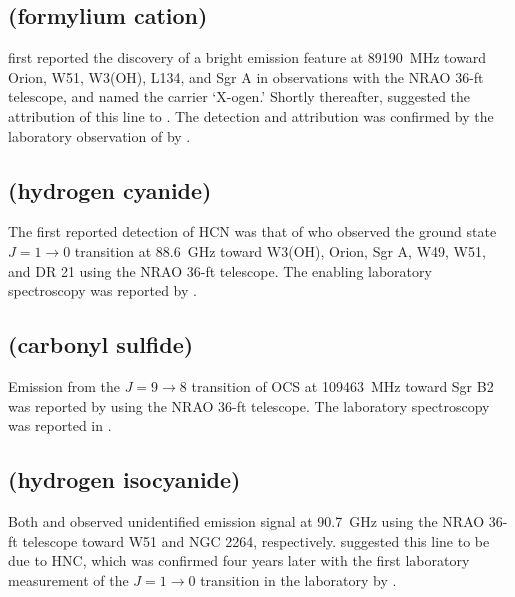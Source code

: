 \documentclass[twocolumn]{aastex631}
\begin{document}
    \subsection{ (formylium cation)}
    \label{HCO+}
    
    \citet{Buhl:1970rd} first reported the discovery of a bright emission feature at 89190~MHz toward Orion, W51, W3(OH), L134, and Sgr A in observations with the NRAO 36-ft telescope, and named the carrier `X-ogen.'  Shortly thereafter, \citet{Klemperer:1970uh} suggested the attribution of this line to .  The detection and attribution was confirmed by the laboratory observation of  by \citet{Woods:1975vi}.
    
    \subsection{ (hydrogen cyanide)}
    \label{HCN}
    
    The first reported detection of HCN was that of \citet{Snyder:1971ps} who observed the ground state $J = 1\rightarrow0$ transition at 88.6~GHz toward W3(OH), Orion, Sgr A, W49, W51, and DR 21 using the NRAO 36-ft telescope.  The enabling laboratory spectroscopy was reported by \citet{deLucia:1969hg}.
    
    \subsection{ (carbonyl sulfide)}
    \label{OCS}
    
    Emission from the $J = 9\rightarrow8$ transition of OCS at 109463~MHz toward Sgr B2 was reported by \citet{Jefferts:1971hy} using the NRAO 36-ft telescope.  The laboratory spectroscopy was reported in \citet{King:1954bn}.
    
    \subsection{ (hydrogen isocyanide)}
    \label{HNC}
    
    Both \citet{Zuckerman:1972cm} and \citet{Snyder:1972jh} observed unidentified emission signal at 90.7~GHz using the NRAO 36-ft telescope toward W51 and NGC 2264, respectively.  \citet{Snyder:1972jh} suggested this line to be due to HNC, which was confirmed four years later with the first laboratory measurement of the $J = 1\rightarrow0$ transition in the laboratory by \citet{Blackman:1976kf}.
    
\end{document}

